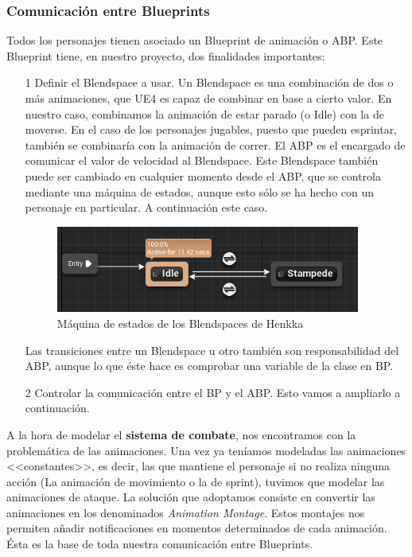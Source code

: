 \subsubsection{Comunicación entre Blueprints}

Todos los personajes tienen asociado un Blueprint de animación o \ac{ABP}. Este Blueprint tiene, en nuestro proyecto, dos finalidades importantes:


\begin{itemize}
\item[1] Definir el Blendspace a usar. Un Blendspace es una combinación de dos o más animaciones, que \ac{UE4} es capaz de combinar en base a cierto valor. En nuestro caso, combinamos la animación de estar parado (o Idle) con la de moverse. En el caso de los personajes jugables, puesto que pueden esprintar, también se combinaría con la animación de correr. El \ac{ABP} es el encargado de comunicar el valor de velocidad al Blendspace. Este Blendspace también puede ser cambiado en cualquier momento desde el \ac{ABP}, que se controla mediante una máquina de estados, aunque esto sólo se ha hecho con un personaje en particular. A continuación este caso.


\begin{figure}[H]
  \centering
  \includegraphics[width=10cm]{./images/Henkka_SM.png}
  \caption{Máquina de estados de los Blendspaces de Henkka}
  \label{HenkkaSM}
\end{figure}


Las transiciones entre un Blendspace u otro también son responsabilidad del \ac{ABP}, aunque lo que éste hace es comprobar una variable de la clase en \ac{BP}.

\item[2] Controlar la comunicación entre el \ac{BP} y el \ac{ABP}. Esto vamos a ampliarlo a continuación.
\end{itemize}


A la hora de modelar el \textbf{sistema de combate}, nos encontramos con la problemática de las animaciones. Una vez ya teníamos modeladas las animaciones <<constantes>>, es decir, las que mantiene el personaje si no realiza ninguna acción (La animación de movimiento o la de sprint), tuvimos que modelar las animaciones de ataque. La solución que adoptamos consiste en convertir las animaciones en los denominados \textit{Animation Montage}. Estos montajes nos permiten añadir notificaciones en momentos determinados de cada animación. Ésta es la base de toda nuestra comunicación entre Blueprints.
\\

